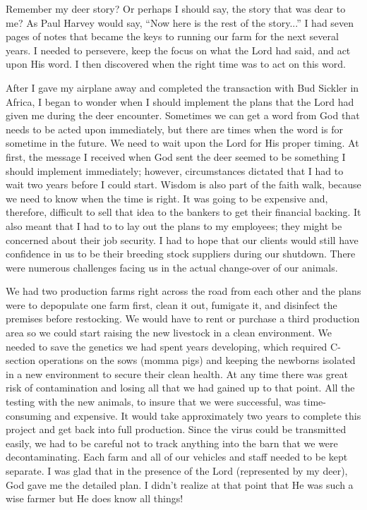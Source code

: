 \documentclass[oneside]{book}
\begin{document}
Remember my deer story? Or perhaps I should say, the story that was dear to me? As Paul Harvey would say, “Now here is the rest of the story...” I had seven pages of notes that became the keys to running our farm for the next several years. I needed to persevere, keep the focus on what the Lord had said, and act upon His word. I then discovered when the right time was to act on this word.

After I gave my airplane away and completed the transaction with Bud Sickler in Africa, I began to wonder when I should implement the plans that the Lord had given me during the deer encounter. Sometimes we can get a word from God that needs to be acted upon immediately, but there are times when the word is for sometime in the future. We need to wait upon the Lord for His proper timing. At first, the message I received when God sent the deer seemed to be something I should implement immediately; however, circumstances dictated that I had to wait two years before I could start. Wisdom is also part of the faith walk, because we need to know when the time is right. It was going to be expensive and, therefore, difficult to sell that idea to the bankers to get their financial backing. It also meant that I had to to lay out the plans to my employees; they might be concerned about their job security. I had to hope that our clients would still have confidence in us to be their breeding stock suppliers during our shutdown. There were numerous challenges facing us in the actual change-over of our animals. 
 
We had two production farms right across the road from each other and the plans were to depopulate one farm first, clean it out, fumigate it, and disinfect the premises before restocking. We would have to rent or purchase a third production area so we could start raising the new livestock in a clean environment. We needed to save the genetics we had spent years developing, which required C-section operations on the sows (momma pigs) and keeping the newborns isolated in a new environment to secure their clean health. At any time there was great risk of contamination and losing all that we had gained up to that point. All the testing with the new animals, to insure that we were successful, was time-consuming and expensive. It would take approximately two years to complete this project and get back into full production. Since the virus could be transmitted easily, we had to be careful not to track anything into the barn that we were decontaminating. Each farm and all of our vehicles and staff needed to be kept separate. I was glad that in the presence of the Lord (represented by my deer), God gave me the detailed plan. I didn’t realize at that point that He was such a wise farmer but He does know all things!
\end{document}
